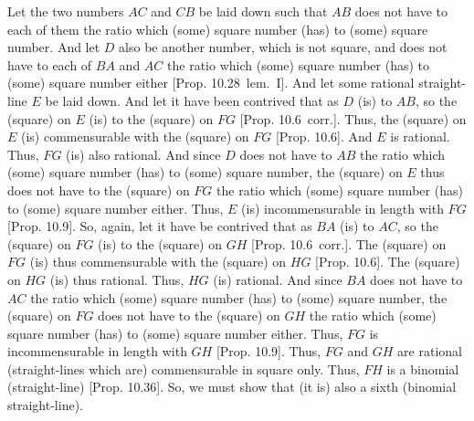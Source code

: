 \begin{Parallel}{}{}
{Let the two numbers $AC$ and $CB$ be laid down such that $AB$ does
not have to each of them the ratio which (some) square number (has) to (some) square number.  And let $D$  also be another number, which is not
square, and does not have to each of $BA$ and $AC$ the ratio which (some)
square number (has) to (some) square number either [Prop. 10.28~lem.~I]. And let some rational straight-line $E$ be laid down. And let it have been contrived that as $D$ (is) to
$AB$, so the (square) on $E$ (is) to the (square) on $FG$ [Prop. 10.6~corr.].  Thus, the (square) on $E$
(is) commensurable with the (square) on $FG$ [Prop. 10.6]. And $E$ is rational. Thus, $FG$
(is) also rational.  And since $D$ does not have to $AB$ the ratio
which (some) square number (has) to (some) square number, the (square) on $E$ thus does not have to the (square) on $FG$ the ratio which (some) square number (has) to (some) square number either. Thus, $E$ (is) incommensurable in length with $FG$ [Prop. 10.9].
So, again, let it have be contrived that as $BA$ (is) to $AC$, so the (square)
on $FG$ (is) to the (square) on $GH$ [Prop. 10.6~corr.]. The (square) on $FG$ (is)
thus commensurable with the (square) on $HG$ [Prop. 10.6].
 The (square) on $HG$ (is) thus rational.  Thus, $HG$ (is) rational. And since $BA$ does not have to
$AC$ the ratio which (some) square number (has) to (some) square number,
the (square) on $FG$ does not have to the (square) on $GH$ the
ratio which (some) square number (has) to (some) square number either.
Thus, $FG$ is incommensurable in length with $GH$ [Prop. 10.9]. Thus, $FG$ and $GH$ are rational (straight-lines which are) commensurable in square only. Thus, $FH$
is a binomial (straight-line) [Prop. 10.36]. So,
we must show that (it is) also a sixth (binomial straight-line).

}
\end{Parallel}
